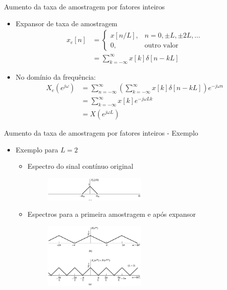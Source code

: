 \begin{slide}{Aumento da taxa de amostragem por fatores inteiros}
	\begin{itemize}
		\item Expansor de taxa de amostragem 
			\begin{align*}
				x_e[n] &= 
				\begin{cases}
					x[n/L],  & n= 0, \pm L, \pm 2L, \dots\\
					0, &\text{outro valor}
				\end{cases}\\
				&= \sum_{k=-\infty}^{\infty}x[k]\delta[n-kL]
			\end{align*}
		\item No domínio da frequência:
			\begin{align*}
				X_e(e^{j\omega})& = \sum_{n=-\infty}^{\infty}\left ( \sum_{k=-\infty}^{\infty}x[k]\delta[n-kL] \right ) e^{-j\omega n}\\
				 &=  \sum_{k=-\infty}^{\infty}x[k] e^{-j\omega L k}\\
				 &=  X(e^{j\omega L})
			\end{align*}
	\end{itemize}
\end{slide}

\begin{slide}{Aumento da taxa de amostragem por fatores inteiros - Exemplo}
	\begin{itemize}
		\item Exemplo para $L=2$
			\begin{itemize}
				\item Espectro do sinal contínuo original
			\begin{figure}
				\centering
				\includegraphics[width=0.5\textwidth]{figs/4-20a.eps}
		        \end{figure}
		\item Espectros para a primeira amostragem e após expansor
			\begin{figure}
				\centering
				\includegraphics[width=0.5\textwidth]{figs/4-24bc.eps}
		        \end{figure}
			\end{itemize}
	\end{itemize}
\end{slide}

